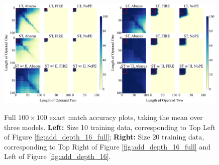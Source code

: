 \documentclass{article}
\begin{document}
\begin{figure}[ht!]
    \centering
    \includegraphics[width=0.49\textwidth]{Figures/grids/grids_plot_eight.pdf}
    \includegraphics[width=0.49\textwidth]{Figures/grids/grids_plot_one.pdf}
    \caption{
    Full $100\times 100$ exact match accuracy plots, taking the mean over three models.
    \textbf{Left:} Size 10 training data, corresponding to Top Left of Figure \ref{fig:add_depth_16_full}; \textbf{Right:} Size \(20\) training data, corresponding to Top Right of Figure \ref{fig:add_depth_16_full} and Left of Figure \ref{fig:add_depth_16}.
    }
    \label{fig:app_grid_10_20}
\end{figure}
\end{document}
